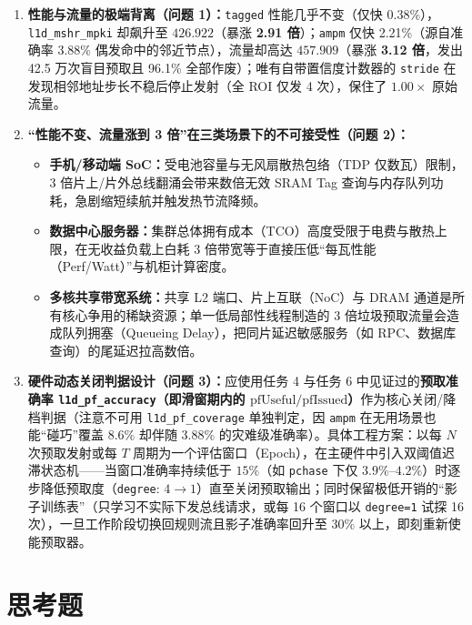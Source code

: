 \documentclass[12pt,a4paper,fontset=mac]{ctexart}
\begin{document}
\begin{enumerate}
  \item \textbf{性能与流量的极端背离（问题 1）：}\texttt{tagged} 性能几乎不变（仅快 0.38\%），\texttt{l1d\_mshr\_mpki} 却飙升至 $426.922$（暴涨 \textbf{2.91 倍}）；\texttt{ampm} 仅快 2.21\%（源自准确率 3.88\% 偶发命中的邻近节点），流量却高达 $457.909$（暴涨 \textbf{3.12 倍}，发出 42.5 万次盲目预取且 96.1\% 全部作废）；唯有自带置信度计数器的 \texttt{stride} 在发现相邻地址步长不稳后停止发射（全 ROI 仅发 4 次），保住了 $1.00\times$ 原始流量。
  \item \textbf{“性能不变、流量涨到 3 倍”在三类场景下的不可接受性（问题 2）：}
  \begin{itemize}
    \item \textbf{手机/移动端 SoC：}受电池容量与无风扇散热包络（TDP 仅数瓦）限制，3 倍片上/片外总线翻涌会带来数倍无效 SRAM Tag 查询与内存队列功耗，急剧缩短续航并触发热节流降频。
    \item \textbf{数据中心服务器：}集群总体拥有成本（TCO）高度受限于电费与散热上限，在无收益负载上白耗 3 倍带宽等于直接压低“每瓦性能（Perf/Watt）”与机柜计算密度。
    \item \textbf{多核共享带宽系统：}共享 L2 端口、片上互联（NoC）与 DRAM 通道是所有核心争用的稀缺资源；单一低局部性线程制造的 3 倍垃圾预取流量会造成队列拥塞（Queueing Delay），把同片延迟敏感服务（如 RPC、数据库查询）的尾延迟拉高数倍。
  \end{itemize}
  \item \textbf{硬件动态关闭判据设计（问题 3）：}应使用任务 4 与任务 6 中见证过的\textbf{预取准确率 \texttt{l1d\_pf\_accuracy}（即滑窗期内的 $\mathrm{pfUseful}/\mathrm{pfIssued}$）}作为核心关闭/降档判据（注意不可用 \texttt{l1d\_pf\_coverage} 单独判定，因 \texttt{ampm} 在无用场景也能“碰巧”覆盖 8.6\% 却伴随 3.88\% 的灾难级准确率）。具体工程方案：以每 $N$ 次预取发射或每 $T$ 周期为一个评估窗口（Epoch），在主硬件中引入双阈值迟滞状态机——当窗口准确率持续低于 $15\%$（如 \texttt{pchase} 下仅 $3.9\%$--$4.2\%$）时逐步降低预取度（\texttt{degree}: $4 \to 1$）直至关闭预取输出；同时保留极低开销的“影子训练表”（只学习不实际下发总线请求，或每 16 个窗口以 \texttt{degree=1} 试探 16 次），一旦工作阶段切换回规则流且影子准确率回升至 $30\%$ 以上，即刻重新使能预取器。
\end{enumerate}

\section{思考题}
\end{document}
